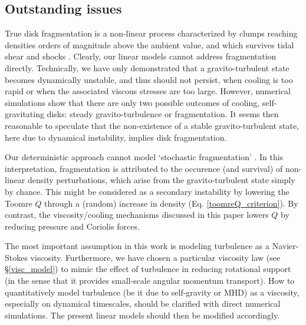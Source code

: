 \subsection{Outstanding issues}
True disk fragmentation is a non-linear process characterized by
clumps reaching densities orders of magnitude above the ambient value, and
which survives tidal shear and shocks \citep{paardekooper12,young16}.  
Clearly, our linear models cannot address fragmentation
directly. Technically, we have only demonstrated that a 
gravito-turbulent state becomes dynamically unstable, and thus should
not persist, when cooling is too rapid or when the associated viscous
stresses are too large.  However, numerical simulations show that
there are only two possible outcomes of cooling, self-gravitating
disks: steady gravito-turbulence or fragmentation. It seems then
reasonable to  speculate that the non-existence of a stable
gravito-turbulent state, here due to dynamical instability, implies
disk fragmentation.   


Our deterministic approach cannot model `stochastic fragmentation'
\citep{paardekooper12,hopkins13}. In this interpretation,  
fragmentation is attributed to the occurence (and survival) 
of non-linear density perturbations, which arise from the
gravito-turbulent state simply by chance. 
This might be considered as a secondary instability by lowering the
Toomre $Q$ through a (random) increase in density
(Eq. \ref{toomreQ_criterion}). By contrast, the viscosity/cooling
mechanisms discussed in this paper lowers $Q$ by reducing pressure and
Coriolis forces. %


The most important assumption in this work is modeling turbulence as a  
Navier-Stokes viscosity. Furthermore, we have chosen a particular  
viscosity law (see \S\ref{visc_model}) to mimic the effect of 
turbulence in reducing rotational support (in the sense that it
provides small-scale angular momentum transport). 
How to quantitatively model turbulence (be it due to self-gravity or
MHD) as a viscosity, especially on dynamical timescales, should be
clarified with direct numerical simulations. The present linear models
should then be modified accordingly. 

